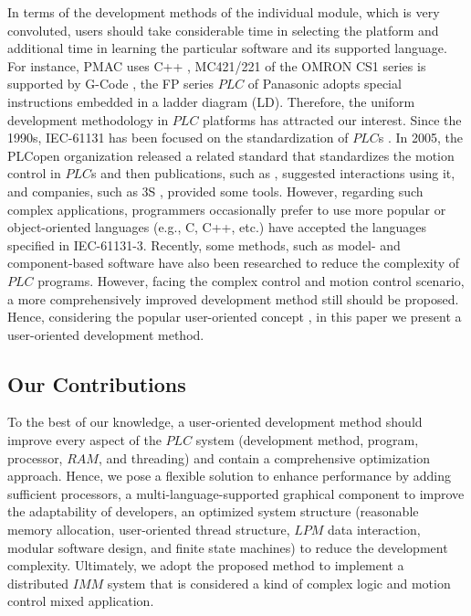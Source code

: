 \documentclass[journal,UTF8]{IEEEtran}
\begin{document}
In terms of the development methods of the individual module, which is very convoluted, users should take considerable time in selecting the platform and additional time in learning the particular software and its supported language. For instance,  PMAC uses C++ \cite{Peng2011Linear,Qian2014A}, MC421/221 of the OMRON CS1 series is supported by G-Code \cite{OMRON2006CS1W}, the FP series $PLC$ of Panasonic adopts special instructions embedded in  a ladder diagram (LD). Therefore, the uniform development methodology in $PLC$ platforms has attracted our interest. Since the 1990s, IEC-61131 has been focused on the standardization of $PLC$s \cite{IEC1993Programmable}. In 2005, the PLCopen organization released a related standard \cite{PLCopen2005Function} that standardizes the motion control in $PLC$s and then publications, such as \cite{S2006Advanced}, suggested interactions using it, and companies, such as 3S \cite{3S2017Logic}, provided some tools. However, regarding such complex applications, programmers occasionally prefer to use more popular or object-oriented languages (e.g., C, C++, etc.) \cite{Bonfe2001Object, Werner2009Object, Basile2013On} have accepted the languages specified in IEC-61131-3. Recently, some methods, such as model- and component-based software \cite{Bonf2013Design, Vyatkin2013Software} have also been researched to reduce the complexity of $PLC$ programs. However, facing the complex control and motion control scenario, a more comprehensively improved development method still should be proposed. Hence, considering the popular user-oriented concept \cite{Verscheure2016User, Choi2017A}, in this paper we present a user-oriented development method.

\subsection{Our Contributions}
To the best of our knowledge, a user-oriented development method should improve every aspect of the $PLC$ system (development method, program, processor, $RAM$, and threading) and contain a comprehensive optimization approach. Hence, we pose a flexible solution to enhance performance by adding sufficient processors, a multi-language-supported graphical component to improve the adaptability of developers, an optimized system structure (reasonable memory allocation, user-oriented thread structure, $LPM$ data interaction, modular software design, and finite state machines) to reduce the development complexity. Ultimately, we adopt the proposed method to implement a distributed $IMM$ system that is considered a kind of complex logic and motion control mixed application.
\end{document}
